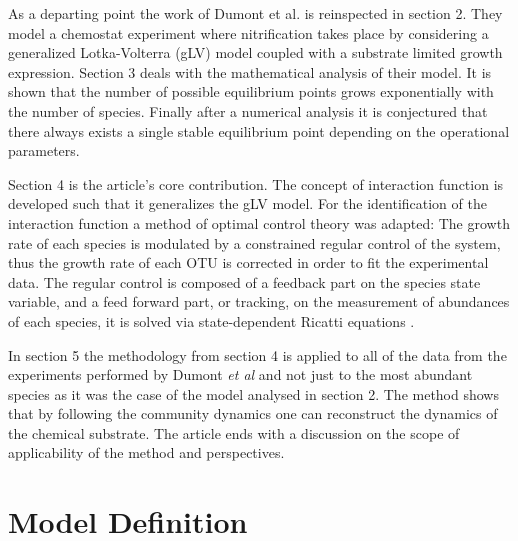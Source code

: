 \documentclass[3p,times]{elsarticle}
\begin{document}
As a departing point the work of Dumont et al.\cite{Dumont2016} is reinspected in section 2. They model a chemostat experiment where nitrification takes place by considering a generalized Lotka-Volterra (gLV) model \cite{Hernandez-Bermejo1997} coupled with a substrate limited growth expression. Section 3 deals with the mathematical analysis of their model. It is shown that the number of possible equilibrium points grows exponentially with the number of species. Finally after a numerical analysis it is conjectured that there always exists a single stable equilibrium point depending on the operational parameters.  

Section 4 is the article's core contribution. The concept of interaction function is developed such that it generalizes the gLV model. For the identification of the interaction function a method of optimal control theory was adapted: The growth rate of each species is modulated by a constrained regular control of the system, thus the growth rate of each OTU is corrected in order to fit the experimental data. The regular control is composed of a feedback part on the species state variable, and a feed forward part, or tracking, on the measurement of abundances of each species, it is solved via state-dependent Ricatti equations \cite{Cimen2008}. 

In section 5 the methodology from section 4 is applied to all of the data from the experiments performed by Dumont \textit{et al}\cite{Dumont2009} and not just to the most abundant species as it was the case of the model analysed in section 2\cite{Dumont2016}. The method shows that by following the community dynamics one can reconstruct the dynamics of the chemical substrate. The article ends with a discussion on the scope of applicability of the method and perspectives. 

\section{Model Definition}
\end{document}
